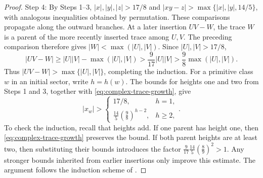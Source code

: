 \documentclass[10pt,twoside]{article}
\theoremstyle{plain}
\theoremstyle{definition}
\theoremstyle{remark}
\begin{document}
\begin{proof}
Step 4: By Steps 1--3, $|x|,|y|,|z|>17/8$ and
$|xy-z|>\max\{|x|,|y|,14/5\}$, with analogous inequalities
obtained by permutation.
These comparisons propagate along the outward branches.
At a later insertion $UV-W$, the trace $W$ is a parent of the
more recently inserted trace among $U,V$. The preceding comparison
therefore gives $|W|<\max(|U|,|V|)$. Since $|U|,|V|>17/8$,
\begin{equation}
\label{eq:complex-trace-growth}
|UV-W|
\geq|U||V|-\max(|U|,|V|)
>\frac9{17}|U||V|
>\frac98\max(|U|,|V|).
\end{equation}
Thus $|UV-W|>\max\{|U|,|V|\}$, completing the induction.
For a primitive class $w$ in an initial sector, write $h=h(w)$.
The bounds for heights one and two from Steps 1 and 3, together
with \eqref{eq:complex-trace-growth}, give
\begin{equation}
\label{eq:complex-height-trace-bounds}
|x_w|>
\begin{cases}
17/8,&h=1,\\
\displaystyle\frac{14}{5}\left(\frac98\right)^{h-2},&h\geq2,
\end{cases}.
\end{equation}
To check the induction, recall that heights add. If one parent
has height one, then \eqref{eq:complex-trace-growth} preserves
the bound. If both parent heights are at least two, then
substituting their bounds introduces the factor
$
\frac9{17}\frac{14}{5}\left(\frac89\right)^2
>1.
$
Any stronger bounds inherited from earlier insertions only
improve this estimate.
The argument follows the induction scheme of
\cite[Lemma~2.1.1(2)]{Bowditch}.


\end{proof}
\end{document}
